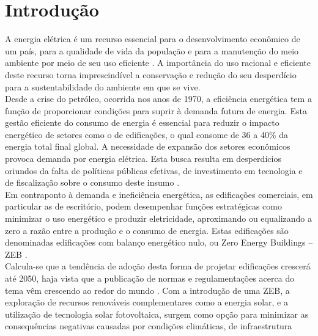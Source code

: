 \section{Introdução}
     A energia elétrica é um recurso essencial para o desenvolvimento econômico de um país, 
     para a qualidade  de  vida  da  população  e para  a  manutenção  do meio  ambiente
     por  meio  de  seu  uso eficiente \cite{Fonseca2016}. A importância do uso racional
     e eficiente deste recurso torna imprescindível a conservação e redução do seu 
     desperdício para a sustentabilidade do ambiente em que se vive.\\ Desde  a  crise  do  
     petróleo,  ocorrida nos  anos  de 1970,  a eficiência  energética tem  a  função  de 
     proporcionar  condições  para  suprir  à  demanda  futura  de  energia.  Esta  gestão  
     eficiente  do consumo  de  energia  é  essencial  para  reduzir  o  impacto  energético  
     de  setores  como  o  de edificações, o qual consome de 36 a 40\% da energia total final
     global. A necessidade de expansão dos   setores   econômicos   provoca   demanda   por
     energia   elétrica.   Esta   busca   resulta   em desperdícios oriundos da falta de 
     políticas públicas efetivas, de investimento em tecnologia e de fiscalização   sobre 
     o   consumo   deste   insumo \cite{InternationalEnergyAgency-IEA2019,InternationalEnergyAgency-IEA2019a,UnitedNationsEnvironmentProgramme-UNEP2019,UnitedNations2017}.\\
     Em contraponto à demanda e ineficiência energética, as edificações comerciais, em particular 
     as de  escritório,  podem  desempenhar  funções  estratégicas  como  minimizar  o  uso  
     energético  e produzir eletricidade, aproximando ou equalizando a zero a razão entre a 
     produção e o consumo de energia. Estas edificações são denominadas edificações com balanço 
     energético nulo, ou Zero Energy Buildings  –  ZEB \cite{Crawley2009,Torcellini2006,Kurnitski2011,Kurnitski2015,Torcellini2015}.\\
     Calcula-se  que  a  tendência  de  adoção  desta  forma  de  projetar edificações crescerá 
     até 2050, haja vista que a publicação de normas e regulamentações acerca do tema vêm 
     crescendo ao redor do mundo \cite{UnitedNationsEnvironmentProgramme-UNEP2019}. Com  a  introdução  de  uma  ZEB,  a  
     exploração  de  recursos  renováveis  complementares  como  a energia solar, e a utilização 
     de tecnologia solar fotovoltaica, surgem como opção para minimizar as    consequências    
     negativas    causadas    por    condições    climáticas,    de    infraestrutura    
